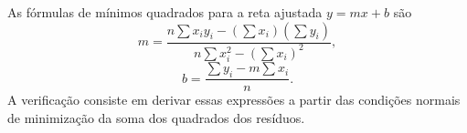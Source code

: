 As fórmulas de mínimos quadrados para a reta ajustada $y=m x+b$ são
\[
m=\frac{n\sum x_i y_i - (\sum x_i)(\sum y_i)}{n\sum x_i^{2} - (\sum x_i)^{2}},
\]
\[
b=\frac{\sum y_i - m\sum x_i}{n}.
\]
A verificação consiste em derivar essas expressões a partir das condições normais de minimização da soma dos quadrados dos resíduos. 